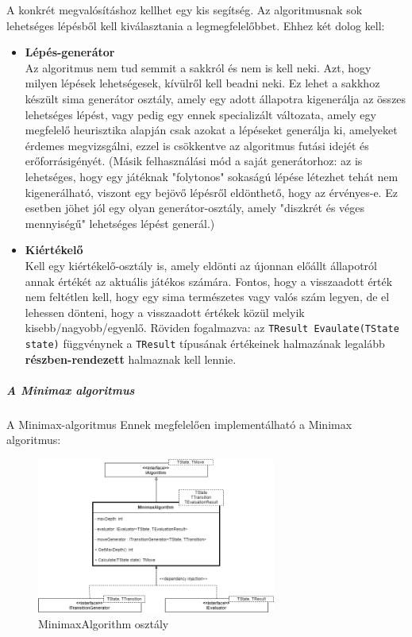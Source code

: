 \documentclass[twoside, a4paper, 12pt]{article}
\renewcommand{\listoffigures}{\begingroup
\tocsection
\tocfile{\listfigurename}{lof}
\endgroup}
\renewcommand{\listoftables}{\begingroup
\tocsection
\tocfile{\listtablename}{lot}
\endgroup}
\begin{document}
A konkrét megvalósításhoz kellhet egy kis segítség. Az algoritmusnak sok lehetséges lépésből kell kiválasztania a legmegfelelőbbet. Ehhez két dolog kell:

\begin{itemize}
	\item \textbf{Lépés-generátor} \\
	Az algoritmus nem tud semmit a sakkról és nem is kell neki. Azt, hogy milyen lépések lehetségesek, kívülről kell beadni neki. Ez lehet a sakkhoz készült sima generátor osztály, amely egy adott állapotra kigenerálja az összes lehetséges lépést, vagy pedig egy ennek specializált változata, amely egy megfelelő heurisztika alapján csak azokat a lépéseket generálja ki, amelyeket érdemes megvizsgálni, ezzel is csökkentve az algoritmus futási idejét és erőforrásigényét. (Másik felhasználási mód a saját generátorhoz: az is lehetséges, hogy egy játéknak "folytonos" sokaságú lépése létezhet tehát nem kigenerálható, viszont egy bejövő lépésről eldönthető, hogy az érvényes-e. Ez esetben jöhet jól egy olyan generátor-osztály, amely "diszkrét és véges mennyiségű" lehetséges lépést generál.)
	
	\item \textbf{Kiértékelő} \\
	Kell egy kiértékelő-osztály is, amely eldönti az újonnan előállt állapotról annak értékét az aktuális játékos számára. Fontos, hogy a visszaadott érték nem feltétlen kell, hogy egy sima természetes vagy valós szám legyen, de el lehessen dönteni, hogy a visszaadott értékek közül melyik kisebb/nagyobb/egyenlő. Röviden fogalmazva: az \texttt{TResult Evaulate(TState state)} függvénynek a \texttt{TResult} típusának értékeinek halmazának legalább \textbf{részben-rendezett} halmaznak kell lennie.
\end{itemize}

\subsubsection{A Minimax algoritmus}
A Minimax-algoritmus 
Ennek megfelelően implementálható a Minimax algoritmus:

\begin{figure}[htbp]
	\centering
	\includegraphics[width=0.7\textwidth]{img/minimaxAbstractDiagram.png}
	\caption{MinimaxAlgorithm osztály}
	\label{fig:minimaxAbstractDiagram}
\end{figure}

\newpage


\part{\bibname}

\listoffigures
\listoftables
\lstlistoflistings
\end{document}
